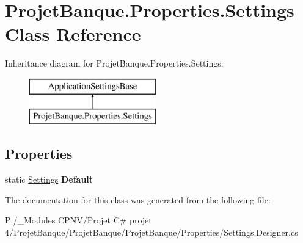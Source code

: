 \hypertarget{class_projet_banque_1_1_properties_1_1_settings}{}\section{Projet\+Banque.\+Properties.\+Settings Class Reference}
\label{class_projet_banque_1_1_properties_1_1_settings}
Inheritance diagram for Projet\+Banque.\+Properties.\+Settings\+:\begin{figure}[H]
\begin{center}
\leavevmode
\includegraphics[height=2.000000cm]{class_projet_banque_1_1_properties_1_1_settings}
\end{center}
\end{figure}
\subsection*{Properties}
\begin{DoxyCompactItemize}
\item 
\mbox{\label{class_projet_banque_1_1_properties_1_1_settings_a6486c851373696ed977458c5ea4eec00}} 
static \mbox{\hyperlink{class_projet_banque_1_1_properties_1_1_settings}{Settings}} {\bfseries Default}
\end{DoxyCompactItemize}


The documentation for this class was generated from the following file\+:\begin{DoxyCompactItemize}
\item 
P\+:/\+\_\+\+Modules C\+P\+N\+V/\+Projet C\# projet 4/\+Projet\+Banque/\+Projet\+Banque/\+Projet\+Banque/\+Properties/Settings.\+Designer.\+cs\end{DoxyCompactItemize}
